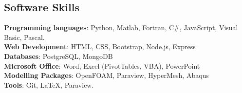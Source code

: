 \documentclass[line]{res}
\newenvironment{p11}
{\begin{adjustwidth}{-25pt}{0pt}
\vspace{8pt}}
{\end{adjustwidth}}
\begin{document}
\begin{resume}
\section{Software Skills}
\begin{p11}
\textbf{Programming languages}: Python, Matlab, Fortran, C\#,  JavaScript, Visual Basic, Pascal.\\
\textbf{Web Development}: HTML, CSS, Bootstrap, Node.js, Express\\
\textbf{Databases}: PostgreSQL, MongoDB\\
\textbf{Microsoft Office}:  Word, Excel (PivotTables, VBA), PowerPoint\\
\textbf{Modelling Packages}: OpenFOAM, Paraview, HyperMesh, Abaqus\\
\textbf{Tools}: Git, \LaTeX,  Paraview.\\
\vspace{4pt}
\end{p11}




\end{resume}
\end{document}
